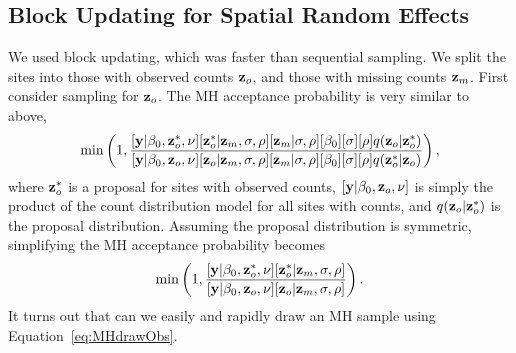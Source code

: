 \documentclass[11pt, titlepage]{article}
\begin{document}
\begin{spacing}{1.9}
\begin{flushleft}

\subsection{Block Updating for Spatial Random Effects}

We used block updating, which was faster than sequential sampling. We split the sites into those with observed counts $\mathbf{z}_{o}$, and those with missing counts $\mathbf{z}_{m}$. First consider sampling for $\mathbf{z}_{o}$. The MH acceptance probability is very similar to above,
\begin{equation} \label{eq:MHblock}
\min\left(1,\frac{[\mathbf{y}|\beta_{0},\mathbf{z}^{*}_{o},\nu][\mathbf{z}^{*}_{o}|\mathbf{z}_{m},\sigma,\rho][\mathbf{z}_{m}|\sigma,\rho][\beta_{0}] [\sigma] [\rho]q(\mathbf{z}_{o}|\mathbf{z}_{o}^{*})}
	{[\mathbf{y}|\beta_{0},\mathbf{z}_{o},\nu][\mathbf{z}_{o}|\mathbf{z}_{m},\sigma,\rho][\mathbf{z}_{m}|\sigma,\rho][\beta_{0}] [\sigma] [\rho]q(\mathbf{z}_{o}^{*}|\mathbf{z}_{o})}\right),
\end{equation}
where $\mathbf{z}^{*}_{o}$ is a proposal for sites with observed counts, $[\mathbf{y}|\beta_{0},\mathbf{z}_{o},\nu]$ is simply the product of the count distribution model for all sites with counts, and $q(\mathbf{z}_{o}|\mathbf{z}_{o}^{*})$ is the proposal distribution. Assuming the proposal distribution is symmetric, simplifying the MH acceptance probability becomes
\begin{equation}\label{eq:MHdrawObs}
\min\left(1,\frac{[\mathbf{y}|\beta_{0},\mathbf{z}^{*}_{o},\nu][\mathbf{z}^{*}_{o}|\mathbf{z}_{m},\sigma,\rho]}
	{[\mathbf{y}|\beta_{0},\mathbf{z}_{o},\nu][\mathbf{z}_{o}|\mathbf{z}_{m},\sigma,\rho]}\right).
\end{equation}
It turns out that can we easily and rapidly draw an MH sample using Equation~\eqref{eq:MHdrawObs}.  


\end{flushleft}
\end{spacing}
\end{document}
